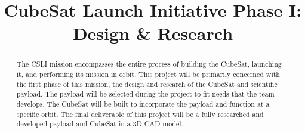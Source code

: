 \documentclass[conference]{IEEEtran} %
\title{CubeSat Launch Initiative Phase I\@: \\ Design \& Research}
\author{
  \IEEEauthorblockN{%
    James~Parkus\IEEEauthorrefmark{1},  %
    Austin~Bodzas\IEEEauthorrefmark{2}
  }
  \IEEEauthorblockA{%
    RIT Space Exploration, Rochester Institute of Technology \\ %
    Rochester, N.Y. \\
    Email:
    \IEEEauthorrefmark{1}jep7631@rit.edu,
    \IEEEauthorrefmark{2}abb6499@rit.edu
  }

}
\begin{document}
\maketitle%

\begin{abstract}
The CSLI mission encompasses the entire process of building the CubeSat, launching it, and performing its mission in orbit. This project will be primarily concerned
with the first phase of this mission, the design and research of the CubeSat and scientific payload. The payload will be selected during the project to fit needs
that the team develops. The CubeSat will be built to incorporate the payload and function at a specific orbit. The final deliverable of this project will be a
fully researched and developed payload and CubeSat in a 3D CAD model.

\end{abstract}

\label{sec:nomenclature}
\newcommand{\nomunit}[1]{%
\renewcommand{\nomentryend}{\hspace*{\fill}#1}}
\renewcommand{\nompreamble}{

  }
\end{document}
